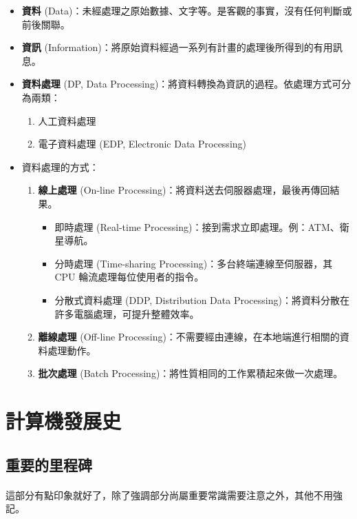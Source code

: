 \documentclass[12pt,a4paper,oneside]{book}
\begin{document}
\begin{CJK}{UTF8}{bkai}
\begin{itemize}
\item \textbf{資料} (Data)：未經處理之原始數據、文字等。是客觀的事實，沒有任何判斷或前後關聯。
\item \textbf{資訊} (Information)：將原始資料經過一系列有計畫的處理後所得到的有用訊息。
\item \textbf{資料處理} (DP, Data Processing)：將資料轉換為資訊的過程。依處理方式可分為兩類：
  \begin{enumerate}
  \item 人工資料處理
  \item 電子資料處理 (EDP, Electronic Data Processing)
  \end{enumerate}
\item 資料處理的方式：
  \begin{enumerate}
  \item \textbf{線上處理} (On-line Processing)：將資料送去伺服器處理，最後再傳回結果。
    \begin{itemize}
    \item 即時處理 (Real-time Processing)：接到需求立即處理。例：ATM、衛星導航。
    \item 分時處理 (Time-sharing Processing)：多台終端連線至伺服器，其 CPU 輪流處理每位使用者的指令。
    \item 分散式資料處理 (DDP, Distribution Data Processing)：將資料分散在許多電腦處理，可提升整體效率。
    \end{itemize}
  \item \textbf{離線處理} (Off-line Processing)：不需要經由連線，在本地端進行相關的資料處理動作。
  \item \textbf{批次處理} (Batch Processing)：將性質相同的工作累積起來做一次處理。
  \end{enumerate}
\end{itemize}

\section{計算機發展史}

\subsection{重要的里程碑}

\paragraph{}這部分有點印象就好了，除了強調部分尚屬重要常識需要注意之外，其他不用強記。


\end{CJK}
\end{document}
